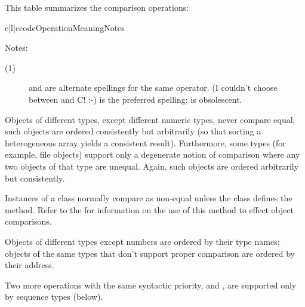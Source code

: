 This table summarizes the comparison operations:

\begin{tableiii}{c|l|c}{code}{Operation}{Meaning}{Notes}
\end{tableiii}
\opindex{==} %

\noindent
Notes:

\begin{description}

\item[(1)]
\code{<>} and \code{!=} are alternate spellings for the same operator.
(I couldn't choose between \ABC{} and C! :-)
\code{!=} is the preferred spelling; \code{<>} is obsolescent.

\end{description}

Objects of different types, except different numeric types, never
compare equal; such objects are ordered consistently but arbitrarily
(so that sorting a heterogeneous array yields a consistent result).
Furthermore, some types (for example, file objects) support only a
degenerate notion of comparison where any two objects of that type are
unequal.  Again, such objects are ordered arbitrarily but
consistently.

Instances of a class normally compare as non-equal unless the class
defines the  method.  Refer to the
 for
information on the use of this method to effect object comparisons.

 Objects of different types except
numbers are ordered by their type names; objects of the same types
that don't support proper comparison are ordered by their address.

Two more operations with the same syntactic priority,
 and , are supported
only by sequence types (below).


